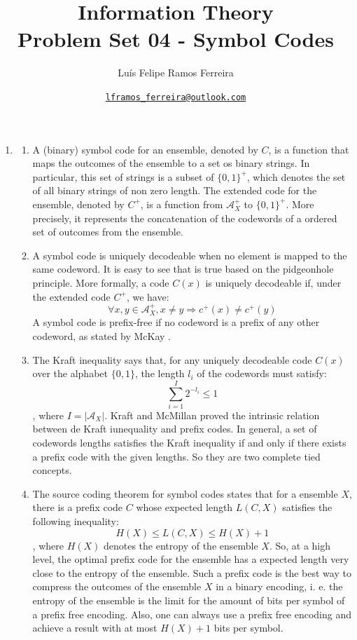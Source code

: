 \documentclass{article}
\title{Information Theory \\ \large Problem Set 04 - Symbol Codes}
\author{Luís Felipe Ramos Ferreira}
\date{\href{mailto:lframos\_ferreira@outlook.com}{\texttt{lframos\_ferreira@outlook.com}}
}
\begin{document}
\maketitle

\begin{enumerate}
	\item \begin{enumerate}
		      \item A (binary) symbol code for an ensemble, denoted by \(C\), is a function that maps the outcomes of the ensemble to a set os binary strings. In particular, this set of strings is a subset of \(\{0, 1\}^+\), which denotes the set of all binary strings of non zero length. The extended code for the ensemble, denoted by \(C^+\), is a function from \(\mathcal{A}_X^+\) to \(\{0, 1\}^+\). More precisely, it represents the concatenation of the codewords of a ordered set of outcomes from the ensemble.
		      \item A symbol code is uniquely decodeable when no element is mapped to the same codeword. It is easy to see that is true based on the pidgeonhole principle. More formally, a code \(C(x)\) is uniquely decodeable if, under the extended code \(C^+\), we have:
		            \[\forall x, y \in \mathcal{A}_X^+, x \neq y \Rightarrow c^+(x) \neq c^+(y)\]
		            A symbol code is prefix-free if no codeword is a prefix of any other codeword, as stated by McKay \cite{MacKay}.
		      \item The Kraft inequality says that, for any uniquely decodeable code \(C(x)\) over the alphabet \(\{0,1\}\), the length \(l_i\) of the codewords must satisfy:
		            \[\sum_{i=1}^{I}2^{-l_i} \leq 1\],
		            where \(I = |\mathcal{A}_X|\).
		            Kraft and McMillan proved the intrinsic relation between de Kraft iunequality and prefix codes. In general, a set of codewords lengths satisfies the Kraft inequality if and only if there exists a prefix code with the given lengths. So they are two complete tied concepts.
		      \item The source coding theorem for symbol codes states that for a ensemble \(X\), there is a prefix code \(C\) whose expected length \(L(C, X)\) satisfies the following inequality:
		            \[H(X) \leq L(C, X) \leq H(X) + 1\],
		            where \(H(X)\) denotes the entropy of the ensemble \(X\).
		            So, at a high level, the optimal prefix code for the ensemble has a expected length very close to the entropy of the ensemble. Such a prefix code is the best way to compress the outcomes of the ensemble \(X\) in a binary encoding, i. e. the entropy of the ensemble is the limit for the amount of bits per symbol of a prefix free encoding. Also, one can always use a prefix free encoding and achieve a result with at most \(H(X) + 1\) bits per symbol.
	      \end{enumerate}


\end{enumerate}
\end{document}
